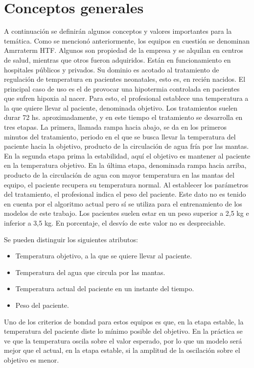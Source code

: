 \section{Conceptos generales}
A continuación se definirán algunos conceptos y valores importantes para la temática.
Como se mencionó anteriormente, los equipos en cuestión se denominan Amrraterm HTF. Algunos son propiedad de la empresa y se alquilan en centros de salud, mientras que otros fueron adquiridos. Están en funcionamiento en hospitales públicos y privados. Su dominio es acotado al tratamiento de regulación de temperatura en pacientes neonatales, esto es, en recién nacidos. El principal caso de uso es el de provocar una hipotermia controlada en pacientes que sufren hipoxia al nacer. Para esto, el profesional establece una temperatura a la que quiere llevar al paciente, denominada objetivo. 
Los tratamientos suelen durar 72 hs. aproximadamente, y en este tiempo el tratamiento se desarrolla en tres etapas. La primera, llamada rampa hacia abajo, se da en los primeros minutos del tratamiento, periodo en el que se busca llevar la temperatura del paciente hacia la objetivo, producto de la circulación de agua fría por las mantas. En la segunda etapa prima la estabilidad, aquí el objetivo es mantener al paciente en la temperatura objetivo. En la última etapa, denominada rampa hacia arriba, producto de la circulación de agua con mayor temperatura en las mantas del equipo, el paciente recupera su temperatura normal.
Al establecer los parámetros del tratamiento, el profesional indica el peso del paciente. Este dato no es tenido en cuenta por el algoritmo actual pero sí se utiliza para el entrenamiento de los modelos de este trabajo.
Los pacientes suelen estar en un peso superior a 2,5 kg e inferior a 3,5 kg. En porcentaje, el desvío de este valor no es despreciable.

Se pueden distinguir los siguientes atributos:
\begin{itemize}
	\item Temperatura objetivo, a la que se quiere llevar al paciente.
	\item Temperatura del agua que circula por las mantas.
	\item Temperatura actual del paciente en un instante del tiempo.
	\item Peso del paciente.
\end{itemize}

Uno de los criterios de bondad para estos equipos es que, en la etapa estable, la temperatura del paciente diste lo mínimo posible del objetivo. En la práctica se ve que la temperatura oscila sobre el valor esperado, por lo que un modelo será mejor que el actual, en la etapa estable, si la amplitud de la oscilación sobre el objetivo es menor.

